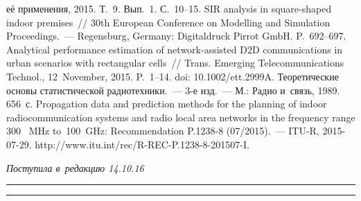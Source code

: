 \begin{multicols}{2}
{{\begin{thebibliography}{99}
её применения, 2015. Т.~9. Вып.~1. С.~10--15.
 SIR analysis in square-shaped indoor premises~// 30th European Conference on 
Modelling and Simulation Proceedings.~--- Regensburg, Germany: Digitaldruck Pirrot GmbH. 
P.~692--697.
 Analytical performance estimation of  
network-assisted D2D communications in urban scenarios with rectangular cells~// Trans.  
Emerging Telecommunications Technol., 12~November, 2015. P.~1--14. doi: 
10.1002/ett.2999A.
 Теоретические основы статистической радиотехники.~--- 3-е изд.~--- М.: 
Радио и~связь, 1989. 656~с.
Propagation data and prediction methods for the planning of indoor radiocommunication systems 
and radio local area networks in the frequency range 300~ MHz to~100~GHz: Recommendation 
P.1238-8 (07/2015).~--- ITU-R, 2015-07-29. {\sf http://www.itu.int/rec/R-REC-P.1238-8-201507-I}.

 \end{thebibliography}

 }
 }

\end{multicols}

\vspace*{-9pt}

\hfill{\small\textit{Поступила в~редакцию 14.10.16}}

\vspace*{8pt}



\hrule

\vspace*{2pt}

\hrule

\vspace*{8pt}


\def\tit{INTERFERENCE ANALYSIS OF~THE~DEVICE-TO-DEVICE 
COMMUNICATIONS MODEL WITH~REGARD TO~A~SIGNAL 
PROPAGATION ENVIRONMENT}

\def\titkol{Interference analysis of~the~device-to-device 
communications model with~regard to~a~signal 
propagation environment}

\def\aut{Yu.\,V.~Gaidamaka$^{1,2}$, S.\,D.~Andreev$^{1,2}$, 
E.\,S.~Sopin$^{1,2}$, K.\,E.~Samouylov$^{1,2}$, and~S.\,Ya.~Shorgin$^2$}

